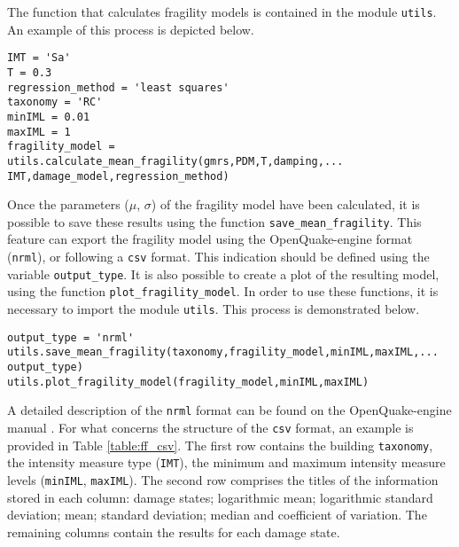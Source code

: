 The function that calculates fragility models is contained in the module \verb=utils=. An example of this process is depicted below.

\begin{Verbatim}[frame=single, commandchars=\\\{\}, samepage=true]
IMT = 'Sa'
T = 0.3
regression_method = 'least squares'
taxonomy = 'RC'
minIML = 0.01
maxIML = 1
fragility_model = utils.calculate_mean_fragility(gmrs,PDM,T,damping,...
IMT,damage_model,regression_method)
\end{Verbatim}

Once the parameters ($\mu$, $\sigma$) of the fragility model have been calculated, it is possible to save these results using the function \verb=save_mean_fragility=. This feature can export the fragility model using the OpenQuake-engine format (\verb=nrml=), or following a \verb=csv= format. This indication should be defined using the variable \verb=output_type=. It is also possible to create a plot of the resulting model, using the function \verb=plot_fragility_model=. In order to use these functions, it is necessary to import the module \verb=utils=. This process is demonstrated below. 

\begin{Verbatim}[frame=single, commandchars=\\\{\}, samepage=true]
output_type = 'nrml'
utils.save_mean_fragility(taxonomy,fragility_model,minIML,maxIML,...
output_type)
utils.plot_fragility_model(fragility_model,minIML,maxIML)
\end{Verbatim}

A detailed description of the \verb=nrml= format can be found on the OpenQuake-engine manual \citep{GEM2015}. For what concerns the structure of the \verb=csv= format, an example is provided in Table \ref{table:ff_csv}. The first row contains the building \verb=taxonomy=, the intensity measure type (\verb=IMT=), the minimum and maximum intensity measure levels (\verb=minIML=, \verb=maxIML=). The second row comprises the titles of the information stored in each column: damage states; logarithmic mean; logarithmic standard deviation; mean; standard deviation; median and coefficient of variation. The remaining columns contain the results for each damage state.

